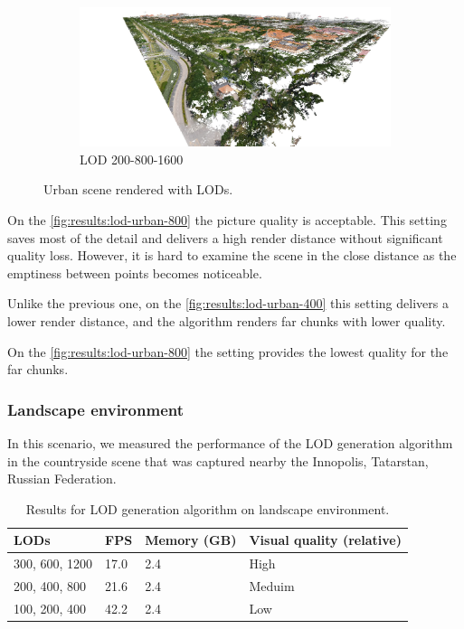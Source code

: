\begin{figure}[htb]
    \begin{subfigure}{0.45\textwidth}
        \centering
        \includegraphics[width=\textwidth]{lod-urban-200.jpg}
        \caption{LOD 200-800-1600}
        \label{fig:results:lod-urban-200}
    \end{subfigure}
    
    \caption{Urban scene rendered with LODs.}
\end{figure}

On the \autoref{fig:results:lod-urban-800} the picture quality is acceptable. This setting saves most of the detail and delivers a high render distance without significant quality loss. However, it is hard to examine the scene in the close distance as the emptiness between points becomes noticeable.

Unlike the previous one, on the \autoref{fig:results:lod-urban-400} this setting delivers a lower render distance, and the algorithm renders far chunks with lower quality.

On the \autoref{fig:results:lod-urban-800} the setting provides the lowest quality for the far chunks.


\subsubsection{Landscape environment}

In this scenario, we measured the performance of the LOD generation algorithm in the countryside scene that was captured nearby the Innopolis, Tatarstan, Russian Federation.

\begin{table}[htb]
    \centering
    \begin{tabular}{l|l|l|l}
    LODs & FPS & Memory (GB) & Visual quality (relative) \\ \hline
    300, 600,   1200 & 17.0 & 2.4 & High \\
    200, 400, 800 & 21.6 & 2.4 & Meduim \\
    100, 200, 400 & 42.2 & 2.4 & Low
    \end{tabular}
    
    \caption{Results for LOD generation algorithm on landscape environment.}
    \label{tab:results:lod-landscape}
\end{table}

